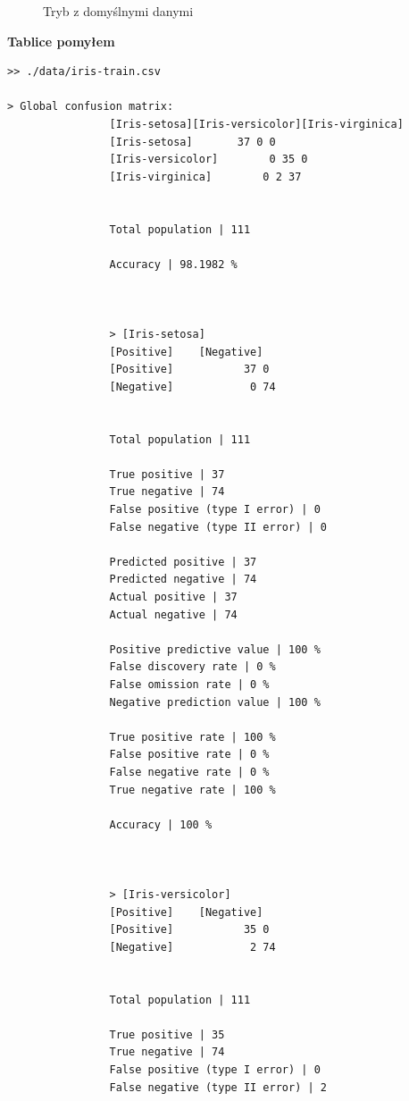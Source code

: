 \documentclass{classrep}
\begin{document}
{{{\begin{figure}[!htbp]
                    \caption{Tryb z domyślnymi danymi}
                \end{figure}
                \FloatBarrier
                \textbf{Tablice pomyłem}
                \begin{lstlisting}
>> ./data/iris-train.csv

> Global confusion matrix:
                [Iris-setosa][Iris-versicolor][Iris-virginica]
                [Iris-setosa]       37 0 0
                [Iris-versicolor]        0 35 0
                [Iris-virginica]        0 2 37


                Total population | 111

                Accuracy | 98.1982 %



                > [Iris-setosa]
                [Positive]    [Negative]
                [Positive]           37 0
                [Negative]            0 74


                Total population | 111

                True positive | 37
                True negative | 74
                False positive (type I error) | 0
                False negative (type II error) | 0

                Predicted positive | 37
                Predicted negative | 74
                Actual positive | 37
                Actual negative | 74

                Positive predictive value | 100 %
                False discovery rate | 0 %
                False omission rate | 0 %
                Negative prediction value | 100 %

                True positive rate | 100 %
                False positive rate | 0 %
                False negative rate | 0 %
                True negative rate | 100 %

                Accuracy | 100 %



                > [Iris-versicolor]
                [Positive]    [Negative]
                [Positive]           35 0
                [Negative]            2 74


                Total population | 111

                True positive | 35
                True negative | 74
                False positive (type I error) | 0
                False negative (type II error) | 2


\end{lstlisting}}}}
\end{document}
